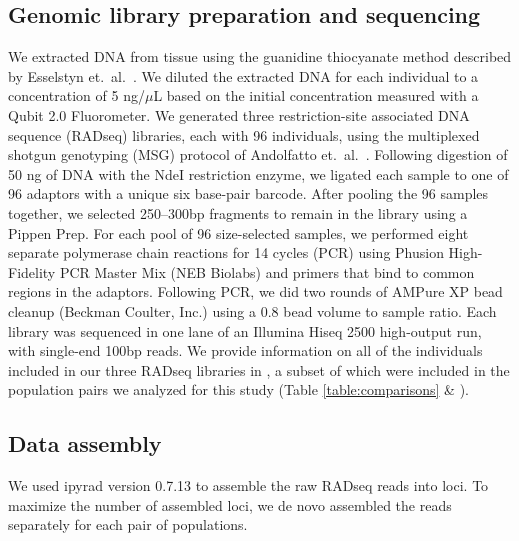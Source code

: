 
\subsection{Genomic library preparation and sequencing}

We extracted DNA from tissue using the guanidine thiocyanate method described
by Esselstyn et.\ al.\ \citeyear{Esselstyn2008}.
We diluted the extracted DNA for each individual to a concentration of 5
ng/$\mu$L based on the initial concentration measured with a Qubit 2.0
Fluorometer.
We generated three restriction-site associated DNA sequence (RADseq) libraries,
each with 96 individuals, using the multiplexed shotgun genotyping (MSG)
protocol of Andolfatto et.\ al.\ \citep{Andolfatto2011}.
Following digestion of 50 ng of DNA with the NdeI restriction enzyme, we
ligated each sample to one of 96 adaptors with a unique six base-pair barcode.
After pooling the 96 samples together, we selected 250--300bp fragments to
remain in the library using a Pippen Prep.
For each pool of 96 size-selected samples, we performed eight separate
polymerase chain reactions for 14 cycles (PCR) using Phusion High-Fidelity PCR
Master Mix (NEB Biolabs) and primers that bind to common regions in the
adaptors.
Following PCR, we did two rounds of AMPure XP bead cleanup (Beckman Coulter,
Inc.) using a 0.8 bead volume to sample ratio.
Each library was sequenced in one lane of an Illumina Hiseq 2500 high-output
run, with single-end 100bp reads.
We provide information on all of the individuals included in our three RADseq
libraries in , a subset of which were included in the
population pairs we analyzed for this study (Table \ref{table:comparisons} \&
).

\subsection{Data assembly}
We used ipyrad version 0.7.13 \citep{ipyrad0713} to assemble the raw RADseq
reads into loci.
To maximize the number of assembled loci, we de novo assembled the reads
separately for each pair of populations.

